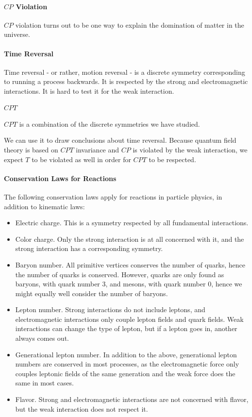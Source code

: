 \paragraph{$CP$ Violation}
$CP$ violation turns out to be one way to explain the domination of matter in the universe.

\paragraph{Time Reversal}
Time reversal - or rather, motion reversal - is a discrete symmetry corresponding to running a process backwards. It is respected by the strong and electromagnetic interactions. It is hard to test it for the weak interaction.

\paragraph{$CPT$}
$CPT$ is a combination of the discrete symmetries we have studied.

We can use it to draw conclusions about time reversal. Because quantum field theory is based on $CPT$ invariance and $CP$ is violated by the weak interaction, we expect $T$ to be violated as well in order for $CPT$ to be respected.

\paragraph{Conservation Laws for Reactions}
The following conservation laws apply for reactions in particle physics, in addition to kinematic laws:
\begin{itemize}
	\item Electric charge. This is a symmetry respected by all fundamental interactions.
	\item Color charge. Only the strong interaction is at all concerned with it, and the strong interaction has a corresponding symmetry.
	\item Baryon number. All primitive vertices conserves the number of quarks, hence the number of quarks is conserved. However, quarks are only found as baryons, with quark number 3, and mesons, with quark number 0, hence we might equally well consider the number of baryons.
	\item Lepton number. Strong interactions do not include leptons, and electromagnetic interactions only couple lepton fields and quark fields. Weak interactions can change the type of lepton, but if a lepton goes in, another always comes out.
	\item Generational lepton number. In addition to the above, generational lepton numbers are conserved in most processes, as the electromagnetic force only couples leptonic fields of the same generation and the weak force does the same in most cases.
	\item Flavor. Strong and electromagnetic interactions are not concerned with flavor, but the weak interaction does not respect it.
\end{itemize}

